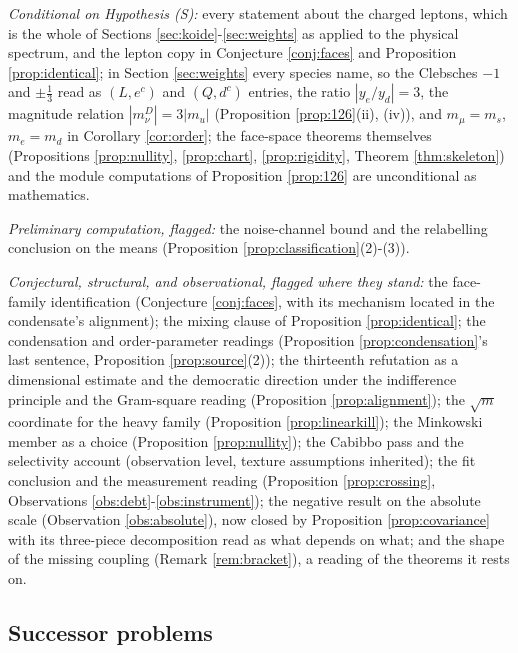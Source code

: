 \documentclass[11pt]{article}
\theoremstyle{definition}
\begin{document}
\emph{Conditional on Hypothesis (S):} every statement about the charged leptons, which is the whole of Sections \ref{sec:koide}-\ref{sec:weights} as applied to the physical spectrum, and the lepton copy in Conjecture \ref{conj:faces} and Proposition \ref{prop:identical}; in Section \ref{sec:weights} every species name, so the Clebsches $-1$ and $\pm\tfrac13$ read as $(L, e^{c})$ and $(Q, d^{c})$ entries, the ratio $|y_{e}/y_{d}| = 3$, the magnitude relation $|m_{\nu}^{D}| = 3|m_{u}|$ (Proposition \ref{prop:126}(ii), (iv)), and $m_{\mu} = m_{s}$, $m_{e} = m_{d}$ in Corollary \ref{cor:order}; the face-space theorems themselves (Propositions \ref{prop:nullity}, \ref{prop:chart}, \ref{prop:rigidity}, Theorem \ref{thm:skeleton}) and the module computations of Proposition \ref{prop:126} are unconditional as mathematics.

\emph{Preliminary computation, flagged:} the noise-channel bound and the relabelling conclusion on the means (Proposition \ref{prop:classification}(2)-(3)).

\emph{Conjectural, structural, and observational, flagged where they stand:} the face-family identification (Conjecture \ref{conj:faces}, with its mechanism located in the condensate's alignment); the mixing clause of Proposition \ref{prop:identical}; the condensation and order-parameter readings (Proposition \ref{prop:condensation}'s last sentence, Proposition \ref{prop:source}(2)); the thirteenth refutation as a dimensional estimate and the democratic direction under the indifference principle and the Gram-square reading (Proposition \ref{prop:alignment}); the $\sqrt{m}$ coordinate for the heavy family (Proposition \ref{prop:linearkill}); the Minkowski member as a choice (Proposition \ref{prop:nullity}); the Cabibbo pass and the selectivity account (observation level, texture assumptions inherited); the fit conclusion and the measurement reading (Proposition \ref{prop:crossing}, Observations \ref{obs:debt}-\ref{obs:instrument}); the negative result on the absolute scale (Observation \ref{obs:absolute}), now closed by Proposition \ref{prop:covariance} with its three-piece decomposition read as what depends on what; and the shape of the missing coupling (Remark \ref{rem:bracket}), a reading of the theorems it rests on.

\subsection*{Successor problems}
\end{document}
